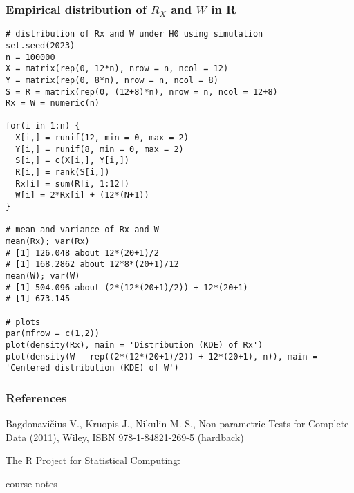 \documentclass[border=5mm, convert, usenames, dvipsnames,beamer]{standalone}
\begin{document}
\begin{frame}[ fragile]{}

\frametitle{Empirical distribution of $R_{X}$ and $W$ in R}

\vspace{30}
\noindent

\tiny
\par

\begin{lstlisting}[style=
R]
# distribution of Rx and W under H0 using simulation
set.seed(2023)
n = 100000
X = matrix(rep(0, 12*n), nrow = n, ncol = 12) 
Y = matrix(rep(0, 8*n), nrow = n, ncol = 8)
S = R = matrix(rep(0, (12+8)*n), nrow = n, ncol = 12+8)
Rx = W = numeric(n)

for(i in 1:n) {
  X[i,] = runif(12, min = 0, max = 2)
  Y[i,] = runif(8, min = 0, max = 2)
  S[i,] = c(X[i,], Y[i,])
  R[i,] = rank(S[i,])
  Rx[i] = sum(R[i, 1:12])
  W[i] = 2*Rx[i] + (12*(N+1))
}

# mean and variance of Rx and W
mean(Rx); var(Rx)
# [1] 126.048 about 12*(20+1)/2
# [1] 168.2862 about 12*8*(20+1)/12
mean(W); var(W)
# [1] 504.096 about (2*(12*(20+1)/2)) + 12*(20+1)
# [1] 673.145 

# plots
par(mfrow = c(1,2))
plot(density(Rx), main = 'Distribution (KDE) of Rx')
plot(density(W - rep((2*(12*(20+1)/2)) + 12*(20+1), n)), main = 'Centered distribution (KDE) of W')
\end{lstlisting}




\par
\end{frame}




\begin{frame}[ fragile]{}
\frametitle{Density plots of $R_{X}$ and $W$
} }

\vspace{50}
\noindent

 \texttt{[image: Rplot1]}


\end{frame}


\begin{frame}[ fragile]{}
\frametitle{References}

\vspace{10}
\noindent
Bagdonavičius V.,  Kruopis J., Nikulin M. S., Non-parametric Tests for Complete Data (2011), Wiley, ISBN 978-1-84821-269-5 (hardback) 

\vspace{10}
\noindent
The R Project for Statistical Computing:

\noindent
{}

\vspace{10}
\noindent
course notes





\par
\end{frame}
\end{document}
